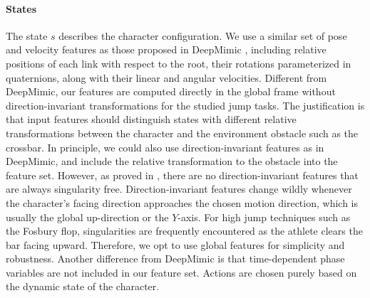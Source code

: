 \paragraph{States}
The state $s$ describes the character configuration. We use a similar set of pose and velocity features as those proposed in DeepMimic \cite{Peng:2018:DeepMimic}, including relative positions of each link with respect to the root, their rotations parameterized in quaternions, along with their linear and angular velocities. Different from DeepMimic, our features are computed directly in the global frame without direction-invariant transformations for the studied jump tasks. The justification is that input features should distinguish states with different relative transformations between the character and the environment obstacle such as the crossbar. In principle, we could also use direction-invariant features as in DeepMimic, and include the relative transformation to the obstacle into the feature set. However, as proved in \cite{Ma19}, there are no direction-invariant features that are always singularity free. Direction-invariant features change wildly whenever the character's facing direction approaches the chosen motion direction, which is usually the global up-direction or the $Y$-axis. For high jump techniques such as the Fosbury flop, singularities are frequently encountered as the athlete clears the bar facing upward. Therefore, we opt to use global features for simplicity and robustness. Another difference from DeepMimic is that time-dependent phase variables are not included in our feature set. Actions are chosen purely based on the dynamic state of the character.

